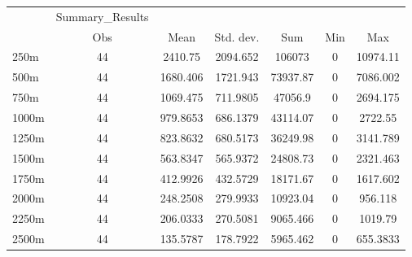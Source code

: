 \begin{tabular}{l*{6}{c}}
\hline\hline
            &Summary\_Results&            &            &            &            &            \\
            &         Obs&        Mean&   Std. dev.&         Sum&         Min&         Max\\
\hline
250m        &          44&     2410.75&    2094.652&      106073&           0&    10974.11\\
500m        &          44&    1680.406&    1721.943&    73937.87&           0&    7086.002\\
750m        &          44&    1069.475&    711.9805&     47056.9&           0&    2694.175\\
1000m       &          44&    979.8653&    686.1379&    43114.07&           0&     2722.55\\
1250m       &          44&    823.8632&    680.5173&    36249.98&           0&    3141.789\\
1500m       &          44&    563.8347&    565.9372&    24808.73&           0&    2321.463\\
1750m       &          44&    412.9926&    432.5729&    18171.67&           0&    1617.602\\
2000m       &          44&    248.2508&    279.9933&    10923.04&           0&     956.118\\
2250m       &          44&    206.0333&    270.5081&    9065.466&           0&     1019.79\\
2500m       &          44&    135.5787&    178.7922&    5965.462&           0&    655.3833\\
\hline\hline
\end{tabular}
